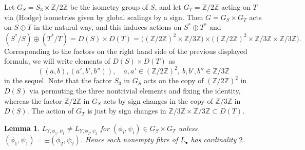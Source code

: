 \documentclass[11pt]{amsart}
\theoremstyle{plain}
\newtheorem{lemma}[theorem]{Lemma}
\numberwithin{equation}{section}
\theoremstyle{definition}
\theoremstyle{remark}
\begin{document}
Let $G_S = S_3 \times \mathbb{Z}/2\mathbb{Z}$ be the isometry group of $S$, and let $G_T = \mathbb{Z}/2\mathbb{Z}$ acting on $T$ via (Hodge) isometries given by global scalings by a sign. Then $G = G_S \times G_T$ acts on $S \oplus T$ in the natural way, and this induces actions on $S^* \oplus T^*$ and 
\[
(S^*/S )\oplus (T^*/T) = D(S) \times D(T) = \bigl(  (\mathbb{Z}/2\mathbb{Z})^2 \times \mathbb{Z}/3\mathbb{Z} \bigr) \times \bigl(  (\mathbb{Z}/2\mathbb{Z})^2 \times \mathbb{Z}/3\mathbb{Z} \times \mathbb{Z}/3\mathbb{Z} \bigr).  
\]
Corresponding to the factors on the right hand side of the previous displayed formula, we will write elements of $D(S) \times D(T)$ as 
\[
((a, b), (a' , b', b'')), \quad a, a' \in ( \mathbb{Z}/2\mathbb{Z})^2 , \: b, b', b'' \in \mathbb{Z}/3\mathbb{Z}
\]
in the sequel. Note that the factor $S_3$ in $G_S$ acts on the copy of $(\mathbb{Z}/2\mathbb{Z})^2$ in $D(S)$ via permuting the three nontrivial elements and fixing the identity, whereas the factor $\mathbb{Z}/2\mathbb{Z}$ in $G_S$ acts by sign changes in the copy of $\mathbb{Z}/3\mathbb{Z}$ in $D(S)$. The action of $G_T$ is just by sign changes in $\mathbb{Z}/3\mathbb{Z} \times \mathbb{Z}/3\mathbb{Z} \subset D(T)$. 
\begin{lemma}\label{lFibresLBullet}
    $L_{Y,\phi_1,\psi_1}\neq L_{Y, \phi_2, \psi_2}$ for $(\phi_i, \psi_i)\in G_S \times G_T$ unless $(\phi_1, \psi_1) = \pm (\phi_2, \psi_2)$. Hence each nonempty fibre of $L_{\bullet}$ has cardinality $2$. 
\end{lemma}
\end{document}
